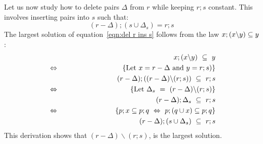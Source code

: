 \documentclass{svproc}
\begin{document}
	Let us now study how to delete pairs $\Delta$ from $r$ while keeping $r;s$ constant.
	This involves inserting pairs into $s$ such that:
\begin{equation}
(r-\Delta);(s\cup\Delta_s)=r;s\label{eqn:del r ins s}
\end{equation}
	The largest solution of equation~\ref{eqn:del r ins s} follows from the law $x;(x\backslash y)\subseteq y$:
\begin{eqnarray}
&&x;(x\backslash y)\ \subs\ y\nonumber\\
&\Leftrightarrow&\hspace{1in}\{\text{Let }x=r-\Delta\text{ and }y=r;s)\}\nonumber\\
&&(r-\Delta);((r-\Delta)\backslash(r;s))\ \subs\ r;s\nonumber\\
&\Leftrightarrow&\hspace{1in}\{\text{Let }\Delta_s\ =\ (r-\Delta)\backslash(r;s)\}\nonumber\\
&&(r-\Delta);\Delta_s\ \subs\ r;s\nonumber\\
&\Leftrightarrow&\hspace{1in}\{p;x\subs p;q\ \Leftrightarrow\ p;(q\cup x)\subs p;q\}\nonumber\\
&&(r-\Delta);(s\cup\Delta_s)\ \subs\ r;s\nonumber
\end{eqnarray}
	This derivation shows that $(r-\Delta)\backslash(r;s)$, is the largest solution.
\end{document}
